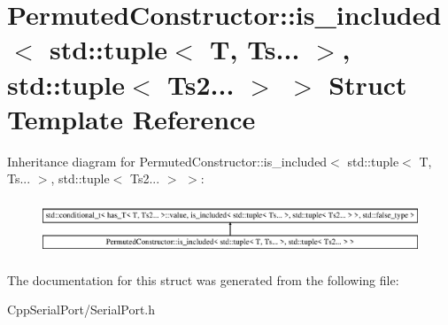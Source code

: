 \hypertarget{struct_permuted_constructor_1_1is__included_3_01std_1_1tuple_3_01_t_00_01_ts_8_8_8_01_4_00_01std7773b1cf7a852a22f74d472d1ee753c4}{}\section{Permuted\+Constructor\+:\+:is\+\_\+included$<$ std\+:\+:tuple$<$ T, Ts... $>$, std\+:\+:tuple$<$ Ts2... $>$ $>$ Struct Template Reference}
\label{struct_permuted_constructor_1_1is__included_3_01std_1_1tuple_3_01_t_00_01_ts_8_8_8_01_4_00_01std7773b1cf7a852a22f74d472d1ee753c4}
Inheritance diagram for Permuted\+Constructor\+:\+:is\+\_\+included$<$ std\+:\+:tuple$<$ T, Ts... $>$, std\+:\+:tuple$<$ Ts2... $>$ $>$\+:\begin{figure}[H]
\begin{center}
\leavevmode
\includegraphics[height=1.651917cm]{struct_permuted_constructor_1_1is__included_3_01std_1_1tuple_3_01_t_00_01_ts_8_8_8_01_4_00_01std7773b1cf7a852a22f74d472d1ee753c4}
\end{center}
\end{figure}


The documentation for this struct was generated from the following file\+:\begin{DoxyCompactItemize}
\item 
Cpp\+Serial\+Port/Serial\+Port.\+h\end{DoxyCompactItemize}
